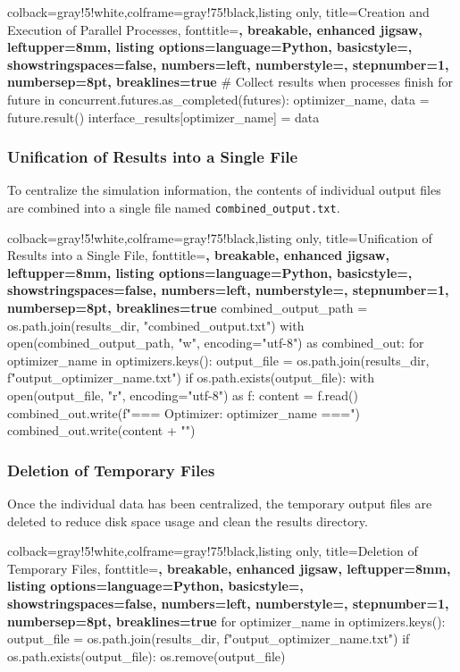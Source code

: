 \begin{tcblisting}{colback=gray!5!white,colframe=gray!75!black,listing only,
    title=Creation and Execution of Parallel Processes, fonttitle=\bfseries, breakable, enhanced jigsaw, leftupper=8mm,
    listing options={language=Python, basicstyle=\ttfamily\small,
    showstringspaces=false, numbers=left, numberstyle=\footnotesize,
    stepnumber=1, numbersep=8pt, breaklines=true}}
# Collect results when processes finish
for future in concurrent.futures.as_completed(futures):
    optimizer_name, data = future.result()
    interface_results[optimizer_name] = data
\end{tcblisting}

\subsubsection{Unification of Results into a Single File}
To centralize the simulation information, the contents of individual output files are combined into a single file named \texttt{combined\_output.txt}.

\begin{tcblisting}{colback=gray!5!white,colframe=gray!75!black,listing only,
    title=Unification of Results into a Single File, fonttitle=\bfseries, breakable, enhanced jigsaw, leftupper=8mm,
    listing options={language=Python, basicstyle=\ttfamily\small,
    showstringspaces=false, numbers=left, numberstyle=\footnotesize,
    stepnumber=1, numbersep=8pt, breaklines=true}}
combined_output_path = os.path.join(results_dir, "combined_output.txt")
with open(combined_output_path, "w", encoding="utf-8") as combined_out:
    for optimizer_name in optimizers.keys():
        output_file = os.path.join(results_dir, f"output_{optimizer_name}.txt")
        if os.path.exists(output_file):
            with open(output_file, "r", encoding="utf-8") as f:
                content = f.read()
            combined_out.write(f"=== Optimizer: {optimizer_name} ===\n")
            combined_out.write(content + "\n")
\end{tcblisting}

\subsubsection{Deletion of Temporary Files}
Once the individual data has been centralized, the temporary output files are deleted to reduce disk space usage and clean the results directory.

\begin{tcblisting}{colback=gray!5!white,colframe=gray!75!black,listing only,
    title=Deletion of Temporary Files, fonttitle=\bfseries, breakable, enhanced jigsaw, leftupper=8mm,
    listing options={language=Python, basicstyle=\ttfamily\small,
    showstringspaces=false, numbers=left, numberstyle=\footnotesize,
    stepnumber=1, numbersep=8pt, breaklines=true}}
for optimizer_name in optimizers.keys():
    output_file = os.path.join(results_dir, f"output_{optimizer_name}.txt")
    if os.path.exists(output_file):
        os.remove(output_file)
\end{tcblisting}

